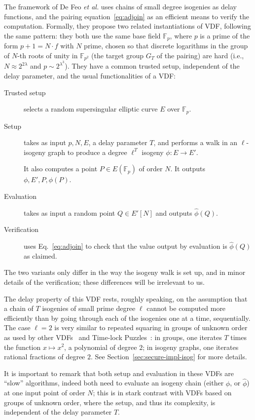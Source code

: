 \documentclass{llncs}
\newcommand{\F}{\mathbb{F}}
\begin{document}
The framework of De Feo \emph{et al.} uses chains of small degree
isogenies as delay functions, and the pairing
equation~\eqref{eq:adjoin} as an efficient means to verify the
computation. %
Formally, they propose two related instantiations of VDF, following
the same pattern: they both use the same base field $\F_p$, where $p$
is a prime of the form $p+1=N\cdot f$ with $N$ prime, chosen so that discrete
logarithms in the group of $N$-th roots of unity in $\F_{p^2}$ (the
target group $G_T$ of the pairing) are hard (i.e., $N\approx 2^{2\lambda}$
and $p\sim 2^{\lambda^3}$). %
They have a common trusted setup, independent of the delay parameter,
and the usual functionalities of a VDF:
\begin{description}
\item[Trusted setup] selects a random supersingular elliptic curve $E$
  over $\F_p$.
\item[Setup] takes as input $p,N,E$, a delay parameter $T$, and
  performs a walk in an $\ell$-isogeny graph to produce a degree
  $\ell^T$ isogeny $\phi:E\to E'$.
  
  It also computes a point $P\in E(\F_p)$ of order $N$. %
  It  outputs $\phi,E',P,\phi(P)$.
\item[Evaluation] takes as input a random point $Q\in E'[N]$ and outputs
  $\hat\phi(Q)$.
\item[Verification] uses Eq.~\eqref{eq:adjoin} to check that the value
  output by evaluation is $\hat\phi(Q)$ as claimed.
\end{description}

The two variants only differ in the way the isogeny walk is set up,
and in minor details of the verification; these differences will be
irrelevant to us.

The delay property of this VDF rests, roughly speaking, on the
assumption that a chain of $T$ isogenies of small prime degree $\ell$
cannot be computed more efficiently than by going through each of the
isogenies one at a time, sequentially. %
The case $\ell=2$ is very similar to repeated squaring in groups of
unknown order as used by other VDFs~\cite{Wesolowski,Pietrzak} and
Time-lock Puzzles~\cite{TLP}: in groups, one iterates $T$ times the
function $x\mapsto x^2$, a polynomial of degree $2$; in isogeny graphs, one
iterates rational fractions of degree $2$. %
See Section~\ref{sec:secure-impl-isog} for more details.

It is important to remark that both setup and evaluation in these VDFs
are ``slow'' algorithms, indeed both need to evaluate an isogeny chain
(either $\phi$, or $\hat\phi$) at one input point of order $N$; this
is in stark contrast with VDFs based on groups of unknown order, where
the setup, and thus its complexity, is independent of the delay
parameter $T$.
\end{document}
